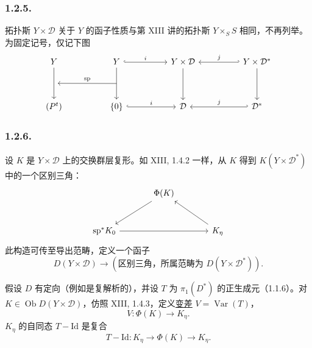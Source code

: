 \subsubsection*{1.2.5.}
拓扑斯 $Y\times\mathcal D$ 关于 $Y$ 的函子性质与第 XIII 讲的拓扑斯 $Y\times_S S$ 相同，不再列举。为固定记号，仅记下图
\[
\begin{tikzcd}[row sep=huge, column sep=huge]
Y \arrow[d, ""{name=A}]
  & Y \arrow[d, ""{name=B}] \arrow[r, hook, "i"]
  & Y\times\mathcal D \arrow[d]
  & Y\times\mathcal D^* \arrow[d] \arrow[l, hook', "j"'] \\
(P^t)
  & \{0\} \arrow[r, hook, "i"]
  & \mathcal D
  & \mathcal D^* \arrow[l, hook', "j"']
    \arrow[from=B, to=A, "\mathrm{sp}"']
\end{tikzcd}
\]

\subsubsection*{1.2.6.}
设 $K$ 是 $Y\times\mathcal D$ 上的交换群层复形。如 XIII, 1.4.2 一样，从 $K$ 得到 $K(Y\times\mathcal D^*)$ 中的一个区别三角：
\[
\begin{tikzcd}[row sep=large, column sep=large]
{} & \Phi(K) \arrow[dl] & {} \\
\mathrm{sp}^*K_0 \arrow[rr] & {} & K_\eta \arrow[ul]
\end{tikzcd}
\]
此构造可传至导出范畴，定义一个函子
\[
D(Y\times\mathcal D)
\longrightarrow
(\text{区别三角，所属范畴为 }D(Y\times\mathcal D^*)).
\]

假设 $D$ 有定向（例如是复解析的），并设 $T$ 为 $\pi_1(D^*)$ 的正生成元（1.1.6）。对 $K\in\operatorname{Ob}D(Y\times\mathcal D)$，仿照 XIII, 1.4.3，定义\underline{变差} $V=\operatorname{Var}(T)$，
\[
V:\Phi(K)\longrightarrow K_\eta.
\]
$K_\eta$ 的自同态 $T-\mathrm{Id}$ 是复合
\[
T-\mathrm{Id}:K_\eta\longrightarrow\Phi(K)
\longrightarrow K_\eta.
\]

